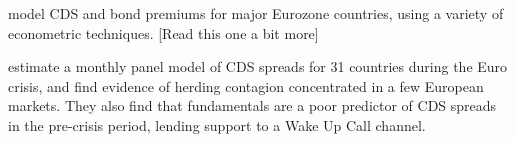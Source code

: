 \documentclass[../base.tex]{subfiles}
\begin{document}
\cite{caporin2013measuring} model CDS and bond premiums for major Eurozone countries, using a variety of econometric techniques. [Read this one a bit more]

\cite{beirne2013pricing} estimate a monthly panel model of CDS spreads for 31 countries during the Euro crisis, and find evidence of herding contagion concentrated in a few European markets. They also find that fundamentals are a poor predictor of CDS spreads in the pre-crisis period, lending support to a Wake Up Call channel.
\end{document}
